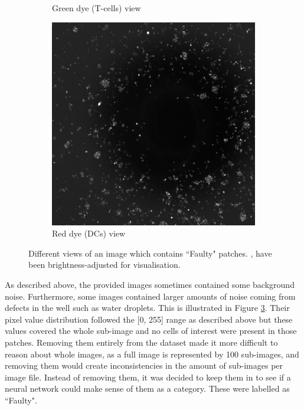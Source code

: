 \begin{figure}[h]
\begin{subfigure}[h!]{0.3\textwidth}
        \caption{Green dye (T-cells) view}
        \label{subfig:tcell}
    \end{subfigure}
    \begin{subfigure}[h!]{0.3\textwidth}
        \includegraphics[width=\textwidth]{dissertation/figures/faulty_dcell.jpg}
        \caption{Red dye (DCs) view}
        \label{subfig:dc}
    \end{subfigure}
    \caption{Different views of an image which contains ``Faulty" patches. \protect{}, \protect{} have been brightness-adjusted for visualisation.}
    \label{fig:noisyimage}
\end{figure}
As described above, the provided images sometimes contained some background noise. Furthermore, some images contained larger amounts of noise coming from defects in the well such as water droplets. This is illustrated in Figure \ref{fig:noisyimage}. Their pixel value distribution followed the [0, 255] range as described above but these values covered the whole sub-image and no cells of interest were present in those patches. Removing them entirely from the dataset made it more difficult to reason about whole images, as a full image is represented by 100 sub-images, and removing them would create inconsistencies in the amount of sub-images per image file. Instead of removing them, it was decided to keep them in to see if a neural network could make sense of them as a category. These were labelled as ``Faulty".

